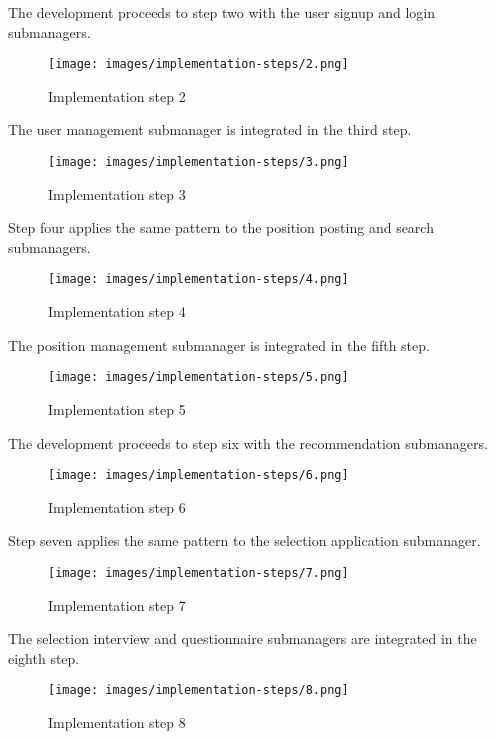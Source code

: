 The development proceeds to step two with the user signup and login submanagers.

\begin{figure}[h]
    \centering
    \texttt{[image: images/implementation-steps/2.png]}
    \caption{Implementation step 2}
\end{figure}

\clearpage
The user management submanager is integrated in the third step.

\begin{figure}[h]
    \centering
    \texttt{[image: images/implementation-steps/3.png]}
    \caption{Implementation step 3}
\end{figure}

\clearpage
Step four applies the same pattern to the position posting and search submanagers.

\begin{figure}[h]
    \centering
    \texttt{[image: images/implementation-steps/4.png]}
    \caption{Implementation step 4}
\end{figure}

\clearpage
The position management submanager is integrated in the fifth step.

\begin{figure}[h]
    \centering
    \texttt{[image: images/implementation-steps/5.png]}
    \caption{Implementation step 5}
\end{figure}

\clearpage
The development proceeds to step six with the recommendation submanagers.

\begin{figure}[h]
    \centering
    \texttt{[image: images/implementation-steps/6.png]}
    \caption{Implementation step 6}
\end{figure}

\clearpage
Step seven applies the same pattern to the selection application submanager.

\begin{figure}[h]
    \centering
    \texttt{[image: images/implementation-steps/7.png]}
    \caption{Implementation step 7}
\end{figure}

\clearpage
The selection interview and questionnaire submanagers are integrated in the eighth step.

\begin{figure}[h]
    \centering
    \texttt{[image: images/implementation-steps/8.png]}
    \caption{Implementation step 8}
\end{figure}

